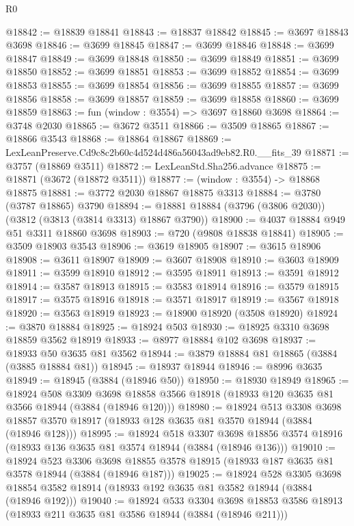 \begin{lexlean}{R0}
\begin{coremodule}
@18842 := @18839 @18841
@18843 := @18837 @18842
@18845 := @3697 @18843 @3698
@18846 := @3699 @18845
@18847 := @3699 @18846
@18848 := @3699 @18847
@18849 := @3699 @18848
@18850 := @3699 @18849
@18851 := @3699 @18850
@18852 := @3699 @18851
@18853 := @3699 @18852
@18854 := @3699 @18853
@18855 := @3699 @18854
@18856 := @3699 @18855
@18857 := @3699 @18856
@18858 := @3699 @18857
@18859 := @3699 @18858
@18860 := @3699 @18859
@18863 := fun (window : @3554) => @3697 @18860 @3698
@18864 := @3748 @2030
@18865 := @3672 @3511
@18866 := @3509 @18865
@18867 := @18866 @3543
@18868 := @18864 @18867
@18869 := LexLeanPreserve.Cd9c8c2b60c4d524d486a56043ad9eb82.R0.__fits_39
@18871 := @3757 (@18869 @3511)
@18872 := LexLeanStd.Sha256.advance
@18875 := @18871 (@3672 (@18872 @3511))
@18877 := (window : @3554) -> @18868 @18875
@18881 := @3772 @2030 @18867 @18875 @3313
@18884 := @3780 (@3787 @18865) @3790
@18894 := @18881 @18884 (@3796 (@3806 @2030)) (@3812 (@3813 (@3814 @3313) @18867 @3790))
@18900 := @4037 @18884 @949 @51 @3311 @18860 @3698
@18903 := @720 (@9808 @18838 @18841)
@18905 := @3509 @18903 @3543
@18906 := @3619 @18905
@18907 := @3615 @18906
@18908 := @3611 @18907
@18909 := @3607 @18908
@18910 := @3603 @18909
@18911 := @3599 @18910
@18912 := @3595 @18911
@18913 := @3591 @18912
@18914 := @3587 @18913
@18915 := @3583 @18914
@18916 := @3579 @18915
@18917 := @3575 @18916
@18918 := @3571 @18917
@18919 := @3567 @18918
@18920 := @3563 @18919
@18923 := @18900 @18920 (@3508 @18920)
@18924 := @3870 @18884
@18925 := @18924 @503
@18930 := @18925 @3310 @3698 @18859 @3562 @18919
@18933 := @8977 @18884 @102 @3698
@18937 := @18933 @50 @3635 @81 @3562
@18944 := @3879 @18884 @81 @18865 (@3884 (@3885 @18884 @81))
@18945 := @18937 @18944
@18946 := @8996 @3635
@18949 := @18945 (@3884 (@18946 @50))
@18950 := @18930 @18949
@18965 := @18924
    @508
    @3309
    @3698
    @18858
    @3566
    @18918
    (@18933 @120 @3635 @81 @3566 @18944 (@3884 (@18946 @120)))
@18980 := @18924
    @513
    @3308
    @3698
    @18857
    @3570
    @18917
    (@18933 @128 @3635 @81 @3570 @18944 (@3884 (@18946 @128)))
@18995 := @18924
    @518
    @3307
    @3698
    @18856
    @3574
    @18916
    (@18933 @136 @3635 @81 @3574 @18944 (@3884 (@18946 @136)))
@19010 := @18924
    @523
    @3306
    @3698
    @18855
    @3578
    @18915
    (@18933 @187 @3635 @81 @3578 @18944 (@3884 (@18946 @187)))
@19025 := @18924
    @528
    @3305
    @3698
    @18854
    @3582
    @18914
    (@18933 @192 @3635 @81 @3582 @18944 (@3884 (@18946 @192)))
@19040 := @18924
    @533
    @3304
    @3698
    @18853
    @3586
    @18913
    (@18933 @211 @3635 @81 @3586 @18944 (@3884 (@18946 @211)))

\end{coremodule}
\end{lexlean}
